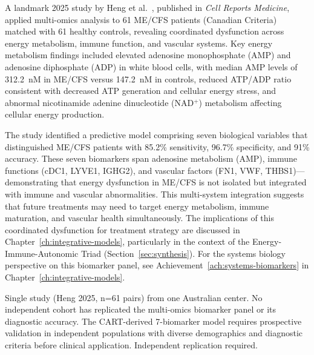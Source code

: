 \begin{achievement}
\label{ach:heng-multiomics}
A landmark 2025 study by Heng et al.~\cite{heng2025mecfs}, published in \textit{Cell Reports Medicine}, applied multi-omics analysis to 61 ME/CFS patients (Canadian Criteria) matched with 61 healthy controls, revealing coordinated dysfunction across energy metabolism, immune function, and vascular systems. Key energy metabolism findings included elevated adenosine monophosphate (AMP) and adenosine diphosphate (ADP) in white blood cells, with median AMP levels of 312.2~nM in ME/CFS versus 147.2~nM in controls, reduced ATP/ADP ratio consistent with decreased ATP generation and cellular energy stress, and abnormal nicotinamide adenine dinucleotide (NAD$^+$) metabolism affecting cellular energy production.

The study identified a predictive model comprising seven biological variables that distinguished ME/CFS patients with 85.2\% sensitivity, 96.7\% specificity, and 91\% accuracy. These seven biomarkers span adenosine metabolism (AMP), immune functions (cDC1, LYVE1, IGHG2), and vascular factors (FN1, VWF, THBS1)---demonstrating that energy dysfunction in ME/CFS is not isolated but integrated with immune and vascular abnormalities. This multi-system integration suggests that future treatments may need to target energy metabolism, immune maturation, and vascular health simultaneously. The implications of this coordinated dysfunction for treatment strategy are discussed in Chapter~\ref{ch:integrative-models}, particularly in the context of the Energy-Immune-Autonomic Triad (Section~\ref{sec:synthesis}). For the systems biology perspective on this biomarker panel, see Achievement~\ref{ach:systems-biomarkers} in Chapter~\ref{ch:integrative-models}.
\end{achievement}

\begin{warning}
Single study (Heng 2025, n=61 pairs) from one Australian center. No independent cohort has replicated the multi-omics biomarker panel or its diagnostic accuracy. The CART-derived 7-biomarker model requires prospective validation in independent populations with diverse demographics and diagnostic criteria before clinical application. Independent replication required.
\end{warning}


